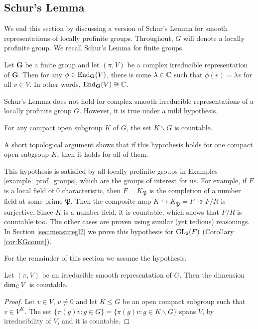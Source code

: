 \subsection{Schur's Lemma}

We end this section by discussing a version of Schur's Lemma for smooth representations of locally profinite groups. Throughout, $G$ will denote a locally profinite group. We recall Schur's Lemma for finite groups.

\begin{thm}
    Let $\mathbf{G}$ be a finite group and let $(\pi,V)$ be a complex irreducible representation of $\mathbf G$. Then for any $\phi\in\mathrm{End}_{\mathbf{G}}(V)$, there is some $\lambda\in\mathbb{C}$ such that $\phi(v)=\lambda v$ for all $v\in V$. In other words, $\mathrm{End}_{\mathbf{G}}(V)\cong\mathbb{C}$.
\end{thm}

Schur's Lemma does not hold for complex smooth irreducible representations of a locally profinite group $G$. However, it is true under a mild hypothesis.

\begin{hypothesis}
    For any compact open subgroup $K$ of $G$, the set $K\backslash G$ is countable.
\end{hypothesis}

A short topological argument shows that if this hypothesis holds for one compact open subgroup $K$, then it holds for all of them.

\begin{example}
    This hypothesis is satisfied by all locally profinite groups in Examples \ref{example_prof_groups}, which are the groups of interest for us. For example, if $F$ is a local field of $0$ characteristic, then $F=K_\mathfrak{P}$ is the completion of a number field at some prime $\mathfrak{P}$. Then the composite map $K\hookrightarrow K_\mathfrak{P}=F\twoheadrightarrow F/R$ is surjective. Since $K$ is a number field, it is countable, which shows that $F/R$ is countable too. The other cases are proven using similar (yet tedious) reasonings. In Section \ref{sec:measuregl2} we prove this hypothesis for $\mathrm{GL}_2(F)$ (Corollary \ref{cor:KGcount}).
\end{example}

For the remainder of this section we assume the hypothesis.

\begin{lemma}
    Let $(\pi,V)$ be an irreducible smooth representation of $G$. Then the dimension $\dim_{\mathbb{C}}V$ is countable.
\end{lemma}
\begin{proof}
    Let $v\in V$, $v\neq0$ and let $K \leq G$ be an open compact subgroup such that $v\in V^K$. The set $\{\pi(g)v:g\in G\}=\{\pi(g)v:g\in K\backslash G\}$ spans $V$, by irreducibility of $V$, and it is countable.
\end{proof}

